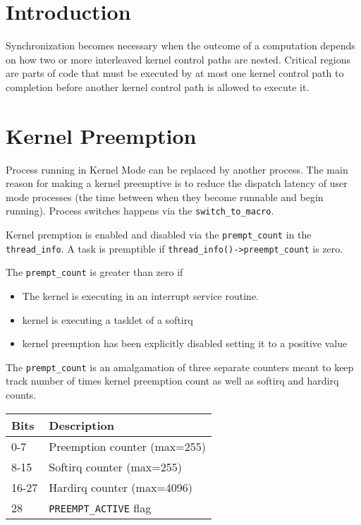 \documentclass{article}
\begin{document}
\section{Introduction}

Synchronization becomes necessary when the outcome of a computation
depends on how two or more interleaved kernel control paths are
nested. Critical regions are parts of code that must be executed by at
most one kernel control path to completion before another kernel
control path is allowed to execute it.


\section{Kernel Preemption}

Process running in Kernel Mode can be replaced by another process.
The main reason for making a kernel preemptive is to reduce the
dispatch latency of user mode processes (the time between when they
become runnable and begin running).  Process switches happens via
the \lstinline{switch_to_macro}.

Kernel premption is enabled and disabled via the
\lstinline{prempt_count} in the \lstinline{thread_info}. A task is
premptible if \lstinline{thread_info()->preempt_count} is zero.

The \lstinline{prempt_count} is greater than zero if 

\begin{itemize}
\item The kernel is executing in an interrupt service routine.
\item kernel is executing a tasklet of a softirq
\item kernel preemption has been explicitly disabled setting it to a
  positive value
\end{itemize}


The \lstinline{prempt_count} is an amalgamation of three separate
counters meant to keep track number of times kernel preemption count
as well as softirq and hardirq counts.

\begin{center}
  \begin{tabular}{| l | l | }    
    \hline
    Bits & Description                    \\ \hline
    0-7 & Preemption counter (max=255)    \\ 
    8-15 & Softirq counter (max=255)      \\ 
    16-27 &  Hardirq counter (max=4096)   \\ 
    28 & \lstinline{PREEMPT_ACTIVE} flag  \\ \hline
  \end{tabular}
\end{center}
\end{document}
